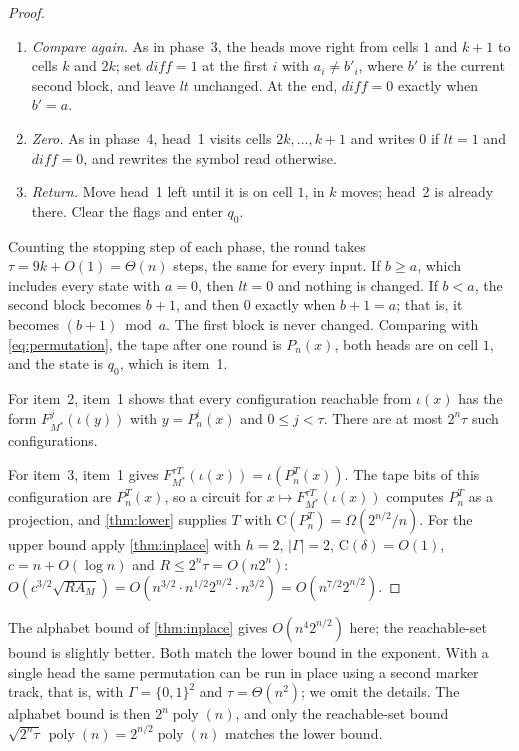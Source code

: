 \documentclass[11pt]{article}
\theoremstyle{definition}
\theoremstyle{remark}
\newcommand{\bits}{\{0,1\}}
\newcommand{\CC}{\mathrm{C}}
\newcommand{\poly}{\operatorname{poly}}
\numberwithin{equation}{section}
\begin{document}
\begin{proof}
\begin{enumerate}
\item \emph{Compare again.}  As in phase~3, the heads move right from
  cells $1$ and $k+1$ to cells $k$ and $2k$; set $\mathit{diff}=1$ at the
  first $i$ with $a_i\neq b'_i$, where $b'$ is the current second block,
  and leave $\mathit{lt}$ unchanged.  At the end, $\mathit{diff}=0$
  exactly when $b'=a$.
\item \emph{Zero.}  As in phase~4, head~1 visits cells
  $2k,\ldots,k+1$ and writes $0$ if $\mathit{lt}=1$ and
  $\mathit{diff}=0$, and rewrites the symbol read otherwise.
\item \emph{Return.}  Move head~1 left until it is on cell $1$, in $k$
  moves; head~2 is already there.  Clear the flags and enter $q_0$.
\end{enumerate}
Counting the stopping step of each phase, the round takes
$\tau=9k+O(1)=\Theta(n)$ steps, the same for every input.  If $b\geq a$, which
includes every state with $a=0$, then $\mathit{lt}=0$ and nothing is
changed.  If $b<a$, the second block becomes $b+1$, and then $0$ exactly
when $b+1=a$; that is, it becomes $(b+1)\bmod a$.  The first block is
never changed.  Comparing with \cref{eq:permutation}, the tape after one
round is $P_n(x)$, both heads are on cell $1$, and the state is $q_0$,
which is item~1.

For item~2, item~1 shows that every configuration reachable from
$\iota(x)$ has the form $F_{M^*}^j(\iota(y))$ with $y=P_n^i(x)$ and
$0\leq j<\tau$.  There are at most $2^n\tau$ such configurations.

For item~3, item~1 gives $F_{M^*}^{\tau T}(\iota(x))=\iota(P_n^T(x))$.
The tape bits of this configuration are $P_n^T(x)$, so a circuit for
$x\mapsto F_{M^*}^{\tau T}(\iota(x))$ computes $P_n^T$ as a projection,
and \cref{thm:lower} supplies $T$ with
$\CC(P_n^T)=\Omega(2^{n/2}/n)$.  For the upper bound apply
\cref{thm:inplace} with $h=2$, $|\Gamma|=2$, $\CC(\delta)=O(1)$,
$c=n+O(\log n)$ and $R\leq2^n\tau=O(n2^n)$:
$O(c^{3/2}\sqrt{RA_M})=O(n^{3/2}\cdot n^{1/2}2^{n/2}\cdot n^{3/2})
=O(n^{7/2}2^{n/2})$.
\end{proof}

The alphabet bound of \cref{thm:inplace} gives $O(n^4 2^{n/2})$ here;
the reachable-set bound is slightly better.  Both match the lower bound
in the exponent.  With a single head the same permutation can be run in
place using a second marker track, that is, with $\Gamma=\bits^2$ and
$\tau=\Theta(n^2)$; we omit the details.  The alphabet bound is then
$2^n\poly(n)$, and only the reachable-set bound
$\sqrt{2^n\tau}\,\poly(n)=2^{n/2}\poly(n)$ matches the lower bound.
\end{document}
